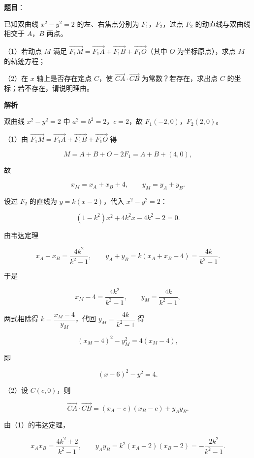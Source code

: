 \begin{answer}

\textbf{题目}：

已知双曲线 $x^2-y^2=2$ 的左、右焦点分别为 $F_1$，$F_2$，过点 $F_2$ 的动直线与双曲线相交于 $A$，$B$ 两点。

（1）若动点 $M$ 满足 $\overrightarrow{F_1M}=\overrightarrow{F_1A}+\overrightarrow{F_1B}+\overrightarrow{F_1O}$（其中 $O$ 为坐标原点），求点 $M$ 的轨迹方程；

（2）在 $x$ 轴上是否存在定点 $C$，使 $\overrightarrow{CA}\cdot\overrightarrow{CB}$ 为常数？若存在，求出点 $C$ 的坐标；若不存在，请说明理由。

\textbf{解析}

双曲线 $x^2-y^2=2$ 中 $a^2=b^2=2$，$c=2$，故 $F_1(-2,0)$，$F_2(2,0)$。

（1）由 $\overrightarrow{F_1M}=\overrightarrow{F_1A}+\overrightarrow{F_1B}+\overrightarrow{F_1O}$ 得

\nopagebreak[4]
\[M=A+B+O-2F_1=A+B+(4,0),\]

故

\nopagebreak[4]
\[x_M=x_A+x_B+4,\qquad y_M=y_A+y_B.\]

设过 $F_2$ 的直线为 $y=k(x-2)$，代入 $x^2-y^2=2$：

\nopagebreak[4]
\[(1-k^2)x^2+4k^2x-4k^2-2=0.\]

由韦达定理

\nopagebreak[4]
\[x_A+x_B=\frac{4k^2}{k^2-1},\qquad y_A+y_B=k(x_A+x_B-4)=\frac{4k}{k^2-1}.\]

于是

\nopagebreak[4]
\[x_M-4=\frac{4k^2}{k^2-1},\qquad y_M=\frac{4k}{k^2-1},\]

两式相除得 $k=\dfrac{x_M-4}{y_M}$，代回 $y_M=\dfrac{4k}{k^2-1}$ 得

\nopagebreak[4]
\[(x_M-4)^2-y_M^2=4(x_M-4),\]

即

\nopagebreak[4]
\[(x-6)^2-y^2=4.\]

（2）设 $C(c,0)$，则

\nopagebreak[4]
\[\overrightarrow{CA}\cdot\overrightarrow{CB}=(x_A-c)(x_B-c)+y_Ay_B.\]

由（1）的韦达定理，

\nopagebreak[4]
\[x_Ax_B=\frac{4k^2+2}{k^2-1},\qquad y_Ay_B=k^2(x_A-2)(x_B-2)=-\frac{2k^2}{k^2-1}.\]


\end{answer}

